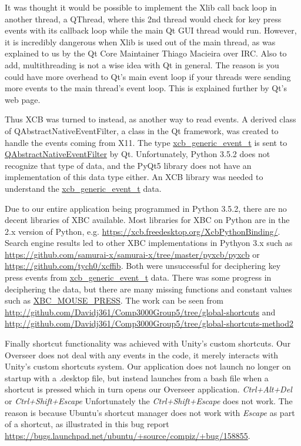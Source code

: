 \documentclass[12pt]{article}
\begin{document}
It was thought it would be possible to implement the Xlib call back loop in another thread, a QThread, where this 2nd thread would check for key press events with its callback loop while the main Qt GUI thread would run.
However, it is incredibly dangerous when Xlib is used out of the main thread, as was explained to us by the Qt Core Maintainer Thiago Macieira over IRC.
Also to add, multithreading is not a wise idea with Qt in general.
The reason is you could have more overhead to Qt's main event loop if your threads were sending more events to the main thread's event loop. This is explained further by Qt's web page\cite{QtThreading}.

Thus XCB was turned to instead, as another way to read events.
A derived class of QAbstractNativeEventFilter, a class in the Qt framework, was created to handle the events coming from X11.
The type \url{xcb_generic_event_t} is sent to \url{QAbstractNativeEventFilter} by Qt.
Unfortunately, Python 3.5.2 does not recognize that type of data, and the PyQt5 library does not have an implementation of this data type either.
An XCB library was needed to understand the \url{xcb_generic_event_t} data.

Due to our entire application being programmed in Python 3.5.2, there are no decent libraries of XBC available.
Most libraries for XBC on Python are in the 2.x version of Python, e.g. \url{https://xcb.freedesktop.org/XcbPythonBinding/}.
Search engine results led to other XBC implementations in Pythyon 3.x such as \url{https://github.com/samurai-x/samurai-x/tree/master/pyxcb/pyxcb} or \url{https://github.com/tych0/xcffib}.
Both were unsuccessful for deciphering key press events from \url{xcb_generic_event_t} data.
There was some progress in deciphering the data, but there are many missing functions and constant values such as \url{XBC_MOUSE_PRESS}. The work can be seen from \url{http://github.com/Davidj361/Comp3000Group5/tree/global-shortcuts} and \url{http://github.com/Davidj361/Comp3000Group5/tree/global-shortcuts-method2}

Finally shortcut functionality was achieved with Unity's custom shortcuts.
Our Overseer does not deal with any events in the code, it merely interacts with Unity's custom shortcuts system.
Our application does not launch no longer on startup with a .desktop file, but instead launches from a bash file when a shortcut is pressed which in turn opens our Overseer application.
\emph{Ctrl+Alt+Del} or \emph{Ctrl+Shift+Escape}
Unfortunately the \emph{Ctrl+Shift+Escape} does not work.
The reason is because Ubuntu's shortcut manager does not work with \emph{Escape} as part of a shortcut, as illustrated in this bug report \url{https://bugs.launchpad.net/ubuntu/+source/compiz/+bug/158855}.
\end{document}

